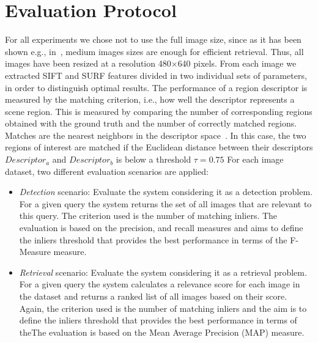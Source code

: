 \section{Evaluation Protocol}\label{evaluation}

For all experiments we chose not to use the full image size, since as it has been shown e.g., in~\cite{kalantidis2011viral}, medium images sizes are enough for efficient retrieval.
Thus, all images have been resized at a resolution 480$\times$640 pixels. From each image we extracted SIFT and SURF features divided in two individual sets of parameters, in order to distinguish optimal results.
The performance of a region descriptor is measured by the matching criterion, i.e., how well the descriptor represents a scene region. This is measured by comparing the number of corresponding regions
obtained with the ground truth and the number of correctly matched regions. Matches are the nearest neighbors in the descriptor space~\cite{mikolajczyk2005performance}.
In this case, the two regions of interest are matched if the Euclidean distance between their descriptors \texttt{$Descriptor_a$} and \texttt{$Descriptor_b$} is below a threshold $\tau = 0.75$
For each image dataset, two different evaluation scenarios are applied:

\begin{itemize}
    \item \textit{Detection} scenario: Evaluate the system considering it as a detection problem. For a given query the system returns the set of all images that are relevant to this query. The criterion used is the number of matching inliers. The evaluation is based on the precision, and recall measures and aims to define the inliers threshold that provides the best performance in terms of the F-Measure measure.

    \item \textit{Retrieval} scenario: Evaluate the system considering it as a retrieval problem. For a given query the system calculates a relevance score for each image in the dataset and returns a ranked list of all images based on their score. Again, the criterion used is the number of matching inliers and the aim is to define the inliers threshold that provides the best performance in terms of theThe evaluation is based on the Mean Average Precision (MAP) measure.
\end{itemize}


